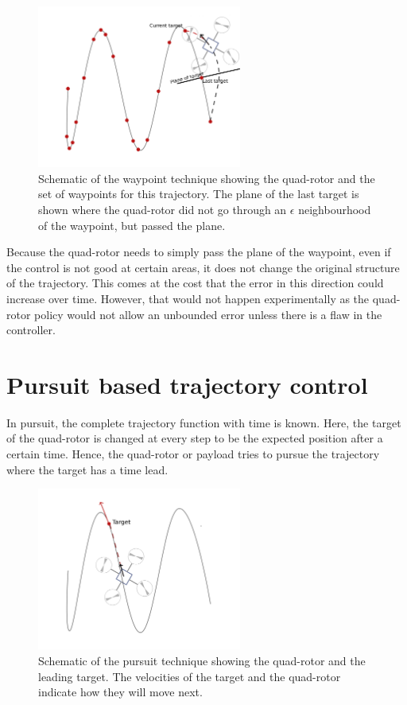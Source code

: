 \documentclass[hidelinks,BTech]{iitmdiss}
\begin{document}
\begin{figure}[H]
  \centering
    \includegraphics[width=0.6\textwidth]{waypoint.png}
    \caption{Schematic of the waypoint technique showing the quad-rotor and the set of waypoints for this trajectory. The plane of the last target is shown where the quad-rotor did not go through an $\epsilon$ neighbourhood of the waypoint, but passed the plane.}
\end{figure}

Because the quad-rotor needs to simply pass the plane of the waypoint, even if the control is not good at certain areas, it does not change the original structure of the trajectory. This comes at the cost that the error in this direction could increase over time. However, that would not happen experimentally as the quad-rotor policy would not allow an unbounded error unless there is a flaw in the controller.

\section{Pursuit based trajectory control}

In pursuit, the complete trajectory function with time is known. Here, the target of the quad-rotor is changed at every step to be the expected position after a certain time. Hence, the quad-rotor or payload tries to pursue the trajectory where the target has a time lead.

\begin{figure}[H]
  \centering
    \includegraphics[width=0.6\textwidth]{pursuit.png}
    \caption{Schematic of the pursuit technique showing the quad-rotor and the leading target. The velocities of the target and the quad-rotor indicate how they will move next.}
\end{figure}
\end{document}
